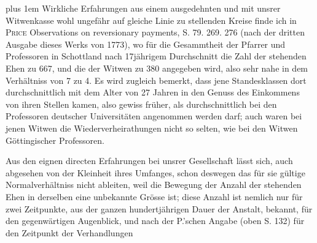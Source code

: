 {\rightskip=0pt plus 1em
Wirkliche Erfahrungen aus einem ausgedehnten und mit unsrer Witwenkasse wohl ungefähr auf gleiche Linie zu stellenden Kreise finde ich in \textsc{Price} Observations on reversionary payments, S. 79. 269. 276 (nach der dritten Ausgabe dieses Werks von 1773), wo für die Gesammtheit der Pfarrer und Professoren in Schottland nach 17jährigem Durchschnitt die Zahl der stehenden Ehen zu 667, und die der Witwen zu 380 angegeben wird, also sehr nahe in dem Verhältniss von 7 zu 4. Es wird zugleich bemerkt, dass jene Standesklassen dort durchschnittlich mit dem Alter von 27 Jahren in den Genuss des Einkommens von ihren Stellen kamen, also gewiss früher, als durchschnittlich bei den Professoren deutscher Universitäten angenommen werden darf; auch waren bei jenen Witwen die Wiederverheirathungen nicht so selten, wie bei den Witwen Göttingischer Professoren.\par}


Aus den eignen directen Erfahrungen bei unsrer Gesellschaft lässt sich, auch abgesehen von der Kleinheit ihres Umfanges, schon deswegen das für sie gültige Normalverhältniss nicht ableiten, weil die Bewegung der Anzahl der stehenden Ehen in derselben eine unbekannte Grösse ist; diese Anzahl ist nemlich nur für zwei Zeitpunkte, aus der ganzen hundertjährigen Dauer der Anstalt, bekannt, für den gegenwärtigen Augenblick, und nach der P.’schen Angabe (oben S. 132) für den Zeitpunkt der Verhandlungen
